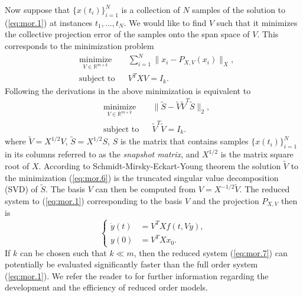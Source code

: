 Now suppose that $\{x(t_i)\}_{i=1}^N$ is a collection of $N$ samples of the solution to (\ref{eq:mor.1}) at instances $t_1,\dots,t_N$. We would like to find $V$ such that it minimizes the collective projection error of the samples onto the span space of $V$. This corresponds to the minimization problem
\begin{equation} \label{eq:mor.5}
\begin{aligned}
& \underset{V\in \mathbb{R}^{m\times k}}{\text{minimize}}
& & \sum_{i=1}^N \| x_i - P_{X,V}(x_i) \|_X, \\
& \text{subject to}
& & V^TXV = I_k.
\end{aligned}
\end{equation}
Following the derivations in \cite{quarteroni2015reduced} the above minimization is equivalent to
\begin{equation} \label{eq:mor.6}
\begin{aligned}
& \underset{V\in \mathbb{R}^{m\times k}}{\text{minimize}}
& & \| \tilde S - \tilde V \tilde V^T \tilde S \|_2, \\
& \text{subject to}
& & \tilde V^T\tilde V = I_k.
\end{aligned}
\end{equation}
where $\tilde V = X^{1/2} V$, $\tilde S = X^{1/2} S$, $S$ is the matrix that contains samples $\{x(t_i)\}_{i=1}^N$ in its columns referred to as the \emph{snapshot matrix}, and $X^{1/2}$ is the matrix square root of $X$. According to Schmidt-Mirsky-Eckart-Young theorem \cite{Markovsky:2011:LRA:2103589} the solution $\tilde V$ to the minimization (\ref{eq:mor.6}) is the truncated singular value decomposition (SVD) of $\tilde S$. The basis $V$ can then be computed from $V = X^{-1/2}\tilde V$. The reduced system to (\ref{eq:mor.1}) corresponding to the basis $V$ and the projection $P_{X,V}$ then is
\begin{equation} \label{eq:mor.7}
	\left\{
	\begin{aligned}
	\dot y(t) &= V^TX f(t,Vy), \\
	y(0) &= V^TX x_0.
	\end{aligned}
	\right.
\end{equation}
If $k$ can be chosen such that $k \ll m$, then the reduced system (\ref{eq:mor.7}) can potentially be evaluated significantly faster than the full order system (\ref{eq:mor.1}). We refer the reader to \cite{hesthaven2015certified,quarteroni2015reduced} for further information regarding the development and the efficiency of reduced order models.

